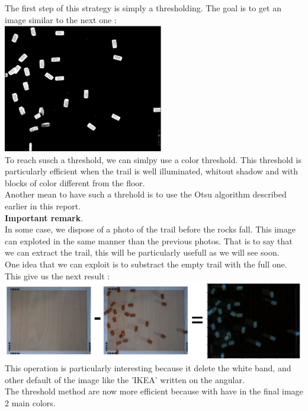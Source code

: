 \documentclass{article}
\begin{document}
The first step of this strategy is simply a thresholding. The goal is to get an image similar to the next one :\\
\includegraphics[width=7cm]{images/img23.png} \\
To reach susch a threshold, we can simlpy use a color threshold. This threshold is particularly efficient when the trail is well illuminated, whitout shadow and with blocks of color different from the floor.\\
Another mean to have such a threhold is to use the Otsu algorithm described earlier in this report.\\

\textbf{Important remark}.\\
In some case, we dispose of a photo of the trail before the rocks fall. This image can exploted in the same manner than the previous photos. That is to say that we can extract the trail, this will be particularly usefull as we will see soon.\\

One idea that we can exploit is to substract the empty trail with the full one. This give us the next result :\\ 

\includegraphics[width=14cm]{images/img22.png} \\
This operation is particularly interesting because it delete the white band, and other default of the image like the 'IKEA' written on the angular.\\
The threshold method are now more efficient because with have in the final image $2$ main colors.\\
\end{document}
